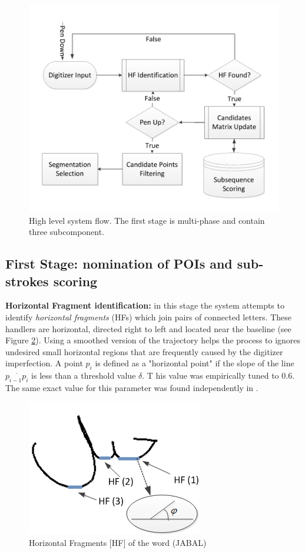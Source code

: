 \documentclass[journal,compsoc]{IEEEtran}
\begin{document}
\begin{figure}
\centering
\includegraphics[width=1.05\columnwidth]{./figures/system_flow}
\caption{High level system flow. The first stage is multi-phase and contain three subcomponent. }
\label{fig:system_flow}
\end{figure}

\subsection{First Stage: nomination of POIs and sub-strokes scoring}

\textbf{Horizontal Fragment identification:} in this stage the system attempts to identify \emph{horizontal fragments} (HFs) which join pairs of connected letters. 
These handlers are horizontal, directed right to left and located near the baseline (see Figure  \ref{fig:horizontal_fragments}). 
Using a smoothed version of the trajectory helps the process to ignores undesired small horizontal regions that are frequently caused by the digitizer imperfection.  
A point $p_{i}$ is defined as a "horizontal point" if the slope of the line $\overline{p_{i-1}p_{i}}$ is less than a threshold value $\delta$. T
his value was empirically tuned to $0.6$. 
The same exact value for this parameter was found independently in \cite{daifallah2009recognition}.\\

\begin{figure}
\centering
\includegraphics[width=0.5\columnwidth]{./figures/horizontal_fragments}
\caption{Horizontal Fragments [HF] of the word (JABAL)}
\label{fig:horizontal_fragments}
\end{figure}
\end{document}

